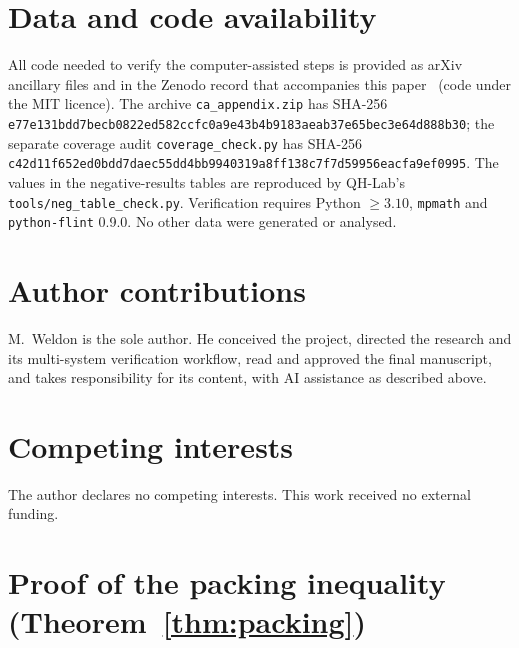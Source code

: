 \documentclass[11pt]{article}
\theoremstyle{definition}
\theoremstyle{remark}
\begin{document}
\section*{Data and code availability}
All code needed to verify the computer-assisted steps is provided as arXiv ancillary files and in the Zenodo record that accompanies
this paper~\cite{QHLab} (code under the MIT licence). The archive \texttt{ca\_appendix.zip} has SHA-256
\texttt{e77e131bdd7becb0822ed582ccfc0a9e43b4b9183aeab37e65bec3e64d888b30}; the separate coverage audit \texttt{coverage\_check.py} has SHA-256
\texttt{c42d11f652ed0bdd7daec55dd4bb9940319a8ff138c7f7d59956eacfa9ef0995}. The values in the negative-results tables are reproduced by
QH-Lab's \texttt{tools/neg\_table\_check.py}. Verification requires Python $\ge3.10$,
\texttt{mpmath} and \texttt{python-flint} 0.9.0. No other data were generated or analysed.

\section*{Author contributions}
M.~Weldon is the sole author. He conceived the project, directed the research and its multi-system verification workflow, read and
approved the final manuscript, and takes responsibility for its content, with AI assistance as described above.

\section*{Competing interests}
The author declares no competing interests. This work received no external funding.




\appendix
\providecommand{\Mb}{\mathrm{Mb}}
\providecommand{\ov}{\mathrm{ov}}
\providecommand{\checker}[1]{\textsf{[CA:~\nolinkurl{#1}]}}
\section{Proof of the packing inequality (Theorem~\ref{thm:packing})}\label{app:proofs}
\end{document}
